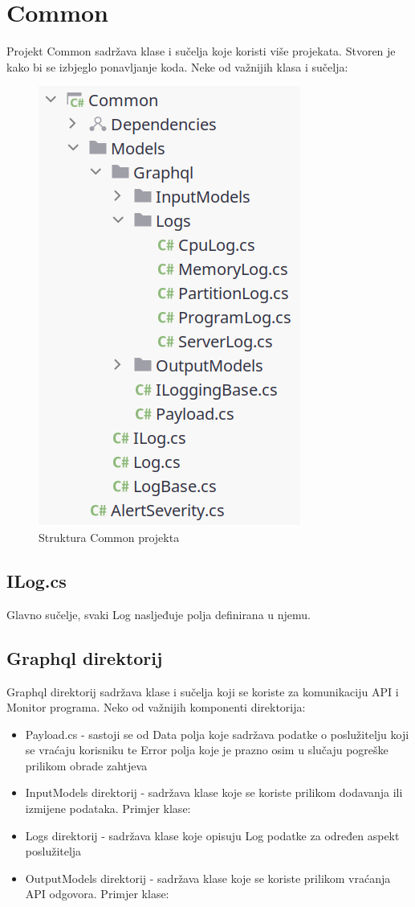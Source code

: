 \documentclass[zavrsnirad]{fer}
\begin{document}
\chapter{Common}
Projekt Common sadržava klase i sučelja koje koristi više projekata. Stvoren je kako bi se izbjeglo ponavljanje koda. Neke od važnijih klasa i sučelja:
\begin{figure}[htb!]
	\centering
	\includegraphics[width=0.4\linewidth]{images/common_structure.png} 
	\caption{Struktura Common projekta}
	\label{slk:common_structure.png}
\end{figure}

\section{ILog.cs}
Glavno sučelje, svaki Log nasljeđuje polja definirana u njemu.


\section{Graphql direktorij}
Graphql direktorij sadržava klase i sučelja koji se koriste za komunikaciju API i Monitor programa.
Neko od važnijih komponenti direktorija:
\begin{itemize}
	\item Payload.cs - sastoji se od Data polja koje sadržava podatke o poslužitelju koji se vraćaju korisniku te Error polja koje je prazno osim u slučaju pogreške prilikom obrade zahtjeva
	\item InputModels direktorij - sadržava klase koje se koriste prilikom dodavanja ili izmijene podataka. Primjer klase:
	
	\item Logs direktorij - sadržava klase koje opisuju Log podatke za određen aspekt poslužitelja
	\item OutputModels direktorij - sadržava klase koje se koriste prilikom vraćanja API odgovora. Primjer klase:
	
\end{itemize}
\end{document}
